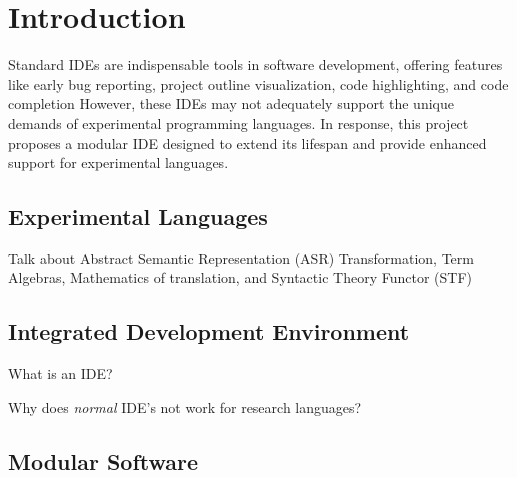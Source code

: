 \chapter{Introduction}

Standard IDEs are indispensable tools in software development, offering features
like early bug reporting, project outline visualization, code highlighting, and
code completion However, these IDEs may not adequately support the unique
demands of experimental programming languages.
In response, this project proposes
a modular IDE designed to extend its lifespan and provide enhanced support for
experimental languages.

\section{Experimental Languages}

Talk about Abstract Semantic Representation (ASR) Transformation,
Term Algebras, Mathematics of  translation, and Syntactic Theory Functor (STF)

\section{Integrated Development Environment}

What is an IDE?

Why does \textit{normal} IDE's not work for research languages?

\section{Modular Software}
